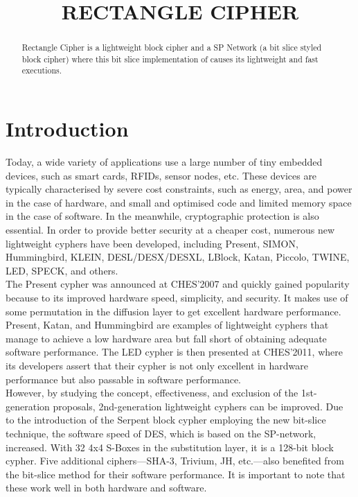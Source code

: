 \documentclass[journal=tosc,preprint]{iacrtrans}
\author{}
\institute{
  Shreyas Pande, 12041420, \email{shreyassachin@iitbhilai.ac.in}
  \and
  Niket Srivastav, 12040980, \email{niketsrivastav@iitbhilai.ac.in}
  \and
  Prathamesh Gujar, 12041100, \email{prathameshgujar@iitbhilai.ac.in}

}
\title{RECTANGLE CIPHER}
\begin{document}
\maketitle




\begin{abstract}
 Rectangle Cipher is a lightweight block cipher and a SP Network (a bit slice styled block cipher) where this bit slice implementation of causes its lightweight and fast executions.

\end{abstract}


\section{Introduction}
Today, a wide variety of applications use a large number of tiny embedded devices, such as smart cards, RFIDs, sensor nodes, etc. These devices are typically characterised by severe cost constraints, such as energy, area, and power in the case of hardware, and small and optimised code and limited memory space in the case of software. In the meanwhile, cryptographic protection is also essential. In order to provide better security at a cheaper cost, numerous new lightweight cyphers have been developed, including Present, SIMON, Hummingbird, KLEIN, DESL/DESX/DESXL, LBlock, Katan, Piccolo, TWINE, LED, SPECK, and others.\\
\hspace*{1cm}The Present cypher was announced at CHES'2007 and quickly gained popularity because to its improved hardware speed, simplicity, and security. It makes use of some permutation in the diffusion layer to get excellent hardware performance. Present, Katan, and Hummingbird are examples of lightweight cyphers that manage to achieve a low hardware area but fall short of obtaining adequate software performance. The LED cypher is then presented at CHES'2011, where its developers assert that their cypher is not only excellent in hardware performance but also passable in software performance.\\
\hspace*{1cm}However, by studying the concept, effectiveness, and exclusion of the 1st-generation proposals, 2nd-generation lightweight cyphers can be improved. Due to the introduction of the Serpent block cypher employing the new bit-slice technique, the software speed of DES, which is based on the SP-network, increased. With 32 4x4 S-Boxes in the substitution layer, it is a 128-bit block cypher. Five additional ciphers—SHA-3, Trivium, JH, etc.—also benefited from the bit-slice method for their software performance. It is important to note that these work well in both hardware and software.\\
\end{document}
